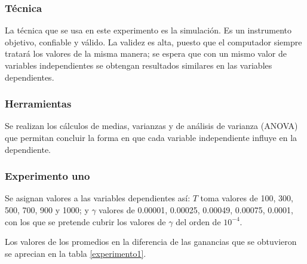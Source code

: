 \subsubsection{Técnica}
La técnica que se usa en este experimento es la simulación. Es un instrumento objetivo, confiable y válido. La validez es alta, puesto que el computador siempre tratará los valores de la misma manera; se espera que con un mismo valor de variables independientes se obtengan resultados similares en las variables dependientes.

\subsubsection{Herramientas}
Se realizan los cálculos de medias, varianzas y de análisis de varianza (ANOVA) que permitan concluir la forma en que cada variable independiente influye en la dependiente.

\subsubsection{Experimento uno}

Se asignan valores a las variables dependientes así: $T$ toma valores de 100, 300, 500, 700, 900 y 1000; y $\gamma$ valores de 0.00001, 0.00025, 0.00049, 0.00075, 0.0001, con los que se pretende cubrir los valores de $\gamma$ del orden de $10^{-4}$.

Los valores de los promedios en la diferencia de las ganancias que se obtuvieron se aprecian en la tabla \ref{experimento1}.

